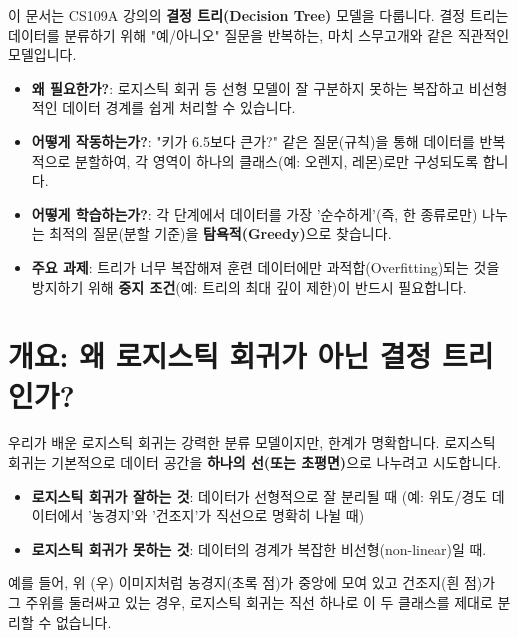 \documentclass[11pt,a4paper]{book}
\theoremstyle{definition}
\begin{document}
\begin{summarybox}
    이 문서는 CS109A 강의의 \textbf{결정 트리(Decision Tree)} 모델을 다룹니다.
    결정 트리는 데이터를 분류하기 위해 "예/아니오" 질문을 반복하는, 마치 스무고개와 같은 직관적인 모델입니다.
    \begin{itemize}
        \item \textbf{왜 필요한가?}: 로지스틱 회귀 등 선형 모델이 잘 구분하지 못하는 복잡하고 비선형적인 데이터 경계를 쉽게 처리할 수 있습니다.
        \item \textbf{어떻게 작동하는가?}: "키가 6.5보다 큰가?" 같은 질문(규칙)을 통해 데이터를 반복적으로 분할하여, 각 영역이 하나의 클래스(예: 오렌지, 레몬)로만 구성되도록 합니다.
        \item \textbf{어떻게 학습하는가?}: 각 단계에서 데이터를 가장 '순수하게'(즉, 한 종류로만) 나누는 최적의 질문(분할 기준)을 \textbf{탐욕적(Greedy)}으로 찾습니다.
        \item \textbf{주요 과제}: 트리가 너무 복잡해져 훈련 데이터에만 과적합(Overfitting)되는 것을 방지하기 위해 \textbf{중지 조건}(예: 트리의 최대 깊이 제한)이 반드시 필요합니다.
    \end{itemize}
\end{summarybox}


\section{개요: 왜 로지스틱 회귀가 아닌 결정 트리인가?}

우리가 배운 로지스틱 회귀는 강력한 분류 모델이지만, 한계가 명확합니다.
로지스틱 회귀는 기본적으로 데이터 공간을 \textbf{하나의 선(또는 초평면)}으로 나누려고 시도합니다.

\begin{itemize}
    \item \textbf{로지스틱 회귀가 잘하는 것}: 데이터가 선형적으로 잘 분리될 때 (예: 위도/경도 데이터에서 '농경지'와 '건조지'가 직선으로 명확히 나뉠 때)
    \item \textbf{로지스틱 회귀가 못하는 것}: 데이터의 경계가 복잡한 비선형(non-linear)일 때.
\end{itemize}


예를 들어, 위 (우) 이미지처럼 농경지(초록 점)가 중앙에 모여 있고 건조지(흰 점)가 그 주위를 둘러싸고 있는 경우, 로지스틱 회귀는 직선 하나로 이 두 클래스를 제대로 분리할 수 없습니다.
\end{document}
